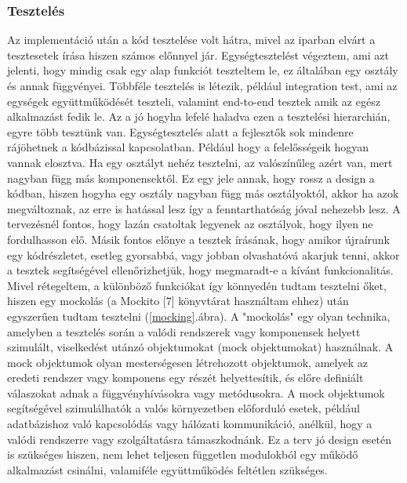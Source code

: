 \documentclass[a4paper,twoside]{article}
\begin{document}
\subsubsection{Tesztelés}
Az implementáció után a kód tesztelése volt hátra, mivel az iparban elvárt a tesztesetek írása hiszen számos előnnyel jár.
Egységtesztelést végeztem, ami azt jelenti, hogy mindig csak egy alap funkciót teszteltem le, ez általában egy osztály és annak függvényei. Többféle tesztelés is létezik, például integration test, ami az egységek együttműködését teszteli, valamint end-to-end tesztek amik az egész alkalmazást fedik le. Az a jó hogyha lefelé haladva ezen a tesztelési hierarchián, egyre több tesztünk van. Egységtesztelés 
alatt a fejlesztők sok mindenre rájöhetnek a kódbázissal kapcsolatban. Például hogy a felelősségeik hogyan vannak elosztva. Ha egy osztályt nehéz tesztelni, az valószínűleg azért van, mert nagyban függ más komponensektől. Ez egy jele annak, hogy rossz a design a kódban, hiszen hogyha egy osztály nagyban függ más osztályoktól, akkor ha azok megváltoznak, az erre is hatással lesz így a fenntarthatóság jóval nehezebb lesz. A tervezésnél fontos, hogy lazán csatoltak legyenek az osztályok, hogy ilyen ne fordulhasson elő. Másik fontos előnye a tesztek írásának, hogy amikor újraírunk egy kódrészletet, esetleg gyorsabbá, vagy jobban olvashatóvá akarjuk tenni, akkor a tesztek segítségével ellenőrizhetjük, hogy megmaradt-e a kívánt funkcionalitás.  Mivel rétegeltem, a különböző funkciókat így könnyedén tudtam tesztelni őket, hiszen
egy mockolás (a Mockito [7] könyvtárat használtam ehhez) után egyszerűen tudtam tesztelni (\ref{mocking}.ábra).
A "mockolás" egy olyan technika, amelyben a tesztelés során a valódi rendszerek vagy
komponensek helyett szimulált, viselkedést utánzó objektumokat (mock objektumokat) használnak.
A mock objektumok olyan mesterségesen létrehozott objektumok, amelyek az
eredeti rendszer vagy komponens egy részét helyettesítik, és előre definiált válaszokat adnak a
függvényhívásokra vagy metódusokra. A mock objektumok segítségével szimulálhatók a
valós környezetben előforduló esetek, például adatbázishoz való kapcsolódás vagy hálózati
kommunikáció, anélkül, hogy a valódi rendszerre vagy szolgáltatásra támaszkodnánk. Ez a terv jó design esetén is szükséges hiszen, nem lehet teljesen független modulokból egy működő alkalmazást csinálni, valamiféle együttműködés feltétlen szükséges. 
\end{document}
